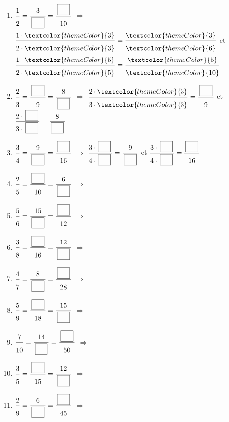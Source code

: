 \begin{enumerate}[leftmargin=*,align=parleft, label=\alph*), itemsep=9pt]
\item $\FA{1}{2}=\FA{3}{\CaseC}=\FA{\CaseC}{10}$ \quad $\Longrightarrow$ \quad $\FA{1 \cdot \textcolor{themeColor}{3}}{2 \cdot \textcolor{themeColor}{3}}=\FA{\textcolor{themeColor}{3}}{\textcolor{themeColor}{6}}$ \quad et \quad $\FA{1 \cdot \textcolor{themeColor}{5}}{2 \cdot \textcolor{themeColor}{5}}=\FA{\textcolor{themeColor}{5}}{\textcolor{themeColor}{10}}$
\item $\FA{2}{3}=\FA{\CaseC}{9}=\FA{8}{\CaseC}$ \quad $\Longrightarrow$ \quad $\FA{2 \cdot \textcolor{themeColor}{3}}{3 \cdot \textcolor{themeColor}{3}}=\FA{\CaseC}{9}$ \quad et \quad $\FA{2 \cdot \CaseC}{3 \cdot \CaseC}=\FA{8}{\CaseC}$
\item $\FA{3}{4}=\FA{9}{\CaseC}=\FA{\CaseC}{16}$ \quad $\Longrightarrow$ \quad $\FA{3 \cdot \CaseC}{4 \cdot \CaseC}=\FA{9}{\CaseC}$ \quad et \quad $\FA{3 \cdot \CaseC}{4 \cdot \CaseC}=\FA{\CaseC}{16}$
\item $\FA{2}{5}=\FA{\CaseC}{10}=\FA{6}{\CaseC}$ \quad $\Longrightarrow$
\item $\FA{5}{6}=\FA{15}{\CaseC}=\FA{\CaseC}{12}$ \quad $\Longrightarrow$
\item $\FA{3}{8}=\FA{\CaseC}{16}=\FA{12}{\CaseC}$ \quad $\Longrightarrow$
\item $\FA{4}{7}=\FA{8}{\CaseC}=\FA{\CaseC}{28}$ \quad $\Longrightarrow$
\item $\FA{5}{9}=\FA{\CaseC}{18}=\FA{15}{\CaseC}$ \quad $\Longrightarrow$
\item $\FA{7}{10}=\FA{14}{\CaseC}=\FA{\CaseC}{50}$ \quad $\Longrightarrow$
\item $\FA{3}{5}=\FA{\CaseC}{15}=\FA{12}{\CaseC}$ \quad $\Longrightarrow$
\item $\FA{2}{9}=\FA{6}{\CaseC}=\FA{\CaseC}{45}$ \quad $\Longrightarrow$
\end{enumerate}
 
\newpage
{}
 
